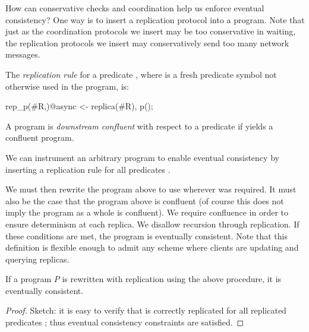 
How can conservative checks and coordination help us enforce eventual consistency?  One way is to insert a replication protocol into a \lang program.  Note that just as the coordination protocols we insert may be too conservative in waiting, the replication protocols we insert may conservatively send too many network messages.  


\begin{definition}
The {\em replication rule} for a predicate , where  is a fresh predicate symbol not otherwise used in the program, is:

\begin{Dedalus}
rep_p(#R,)@async <- replica(#R), p();
\end{Dedalus}
\end{definition}

\begin{definition}
A program is {\em downstream confluent} with respect to a predicate  if  yields a confluent program.
\end{definition}

We can instrument an arbitrary \lang program to enable eventual consistency by inserting a replication rule for all predicates .


We must then rewrite the program above  to use  wherever  was required.  It must also be the case that the program above  is confluent (of course this does not imply the program as a whole is confluent).  We require confluence in order to ensure determinism at each replica.  We disallow recursion through replication.  If these conditions are met, the program is eventually consistent.  Note that this definition is flexible enough to admit any scheme where clients are updating and querying replicas.


\begin{theorem}
If a program $P$ is rewritten with replication using the above procedure, it is eventually consistent.
\end{theorem}
\begin{proof}
Sketch: it is easy to verify that  is correctly replicated for all replicated predicates ; thus eventual consistency constraints are satisfied.
\end{proof}
